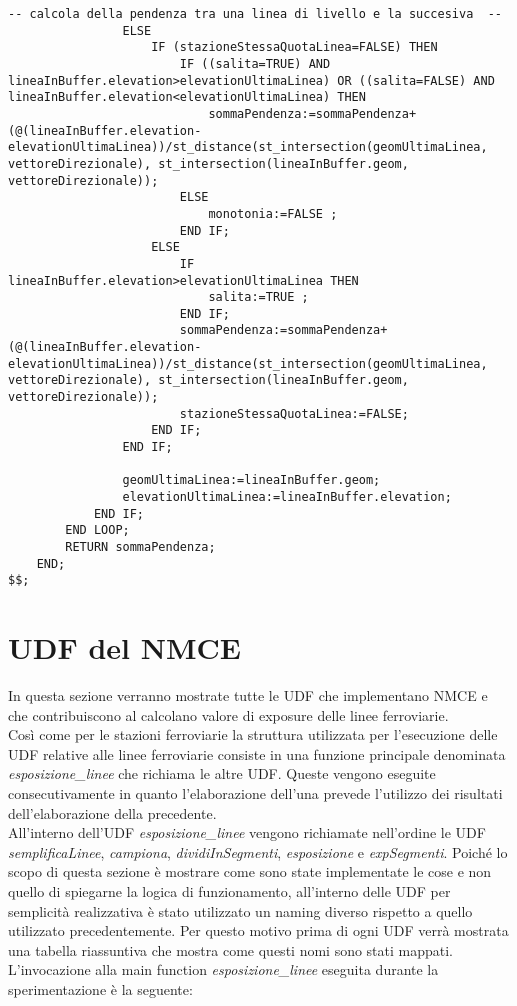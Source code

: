 \begin{lstlisting}[style=mySQL]
				-- calcola della pendenza tra una linea di livello e la succesiva  --
				ELSE
					IF (stazioneStessaQuotaLinea=FALSE) THEN
						IF ((salita=TRUE) AND lineaInBuffer.elevation>elevationUltimaLinea) OR ((salita=FALSE) AND lineaInBuffer.elevation<elevationUltimaLinea) THEN
							sommaPendenza:=sommaPendenza+(@(lineaInBuffer.elevation-elevationUltimaLinea))/st_distance(st_intersection(geomUltimaLinea, vettoreDirezionale), st_intersection(lineaInBuffer.geom, vettoreDirezionale));
						ELSE
							monotonia:=FALSE ;
						END IF;
					ELSE
						IF lineaInBuffer.elevation>elevationUltimaLinea THEN
							salita:=TRUE ;
						END IF;
						sommaPendenza:=sommaPendenza+(@(lineaInBuffer.elevation-elevationUltimaLinea))/st_distance(st_intersection(geomUltimaLinea, vettoreDirezionale), st_intersection(lineaInBuffer.geom, vettoreDirezionale));
						stazioneStessaQuotaLinea:=FALSE;
					END IF;
				END IF;

				geomUltimaLinea:=lineaInBuffer.geom;
				elevationUltimaLinea:=lineaInBuffer.elevation;
			END IF;
		END LOOP;
		RETURN sommaPendenza;
	END;
$$;
\end{lstlisting}


\section{UDF del NMCE}
\label{udfnmce}
In questa sezione verranno mostrate tutte le UDF che implementano NMCE e che contribuiscono al calcolano valore di exposure delle linee ferroviarie.\\ 
Così come per le stazioni ferroviarie la struttura utilizzata per l'esecuzione delle UDF relative alle linee ferroviarie consiste in una funzione principale denominata \textit{esposizione\_linee} che richiama le altre UDF.
Queste vengono eseguite consecutivamente in quanto l'elaborazione dell'una prevede l'utilizzo dei risultati dell'elaborazione della precedente. \\
All'interno dell'UDF \textit{esposizione\_linee} vengono richiamate nell'ordine le UDF \textit{semplificaLinee}, \textit{campiona}, \textit{dividiInSegmenti}, \textit{esposizione} e \textit{expSegmenti}.
Poiché lo scopo di questa sezione è mostrare come sono state implementate le cose e non quello di spiegarne la logica di funzionamento, all'interno delle UDF per semplicità realizzativa è stato utilizzato un naming diverso rispetto a quello utilizzato precedentemente. Per questo motivo prima di ogni UDF verrà mostrata una tabella riassuntiva che mostra come questi nomi sono stati mappati. 
L'invocazione alla main function \textit{esposizione\_linee} eseguita durante la sperimentazione è la seguente:

